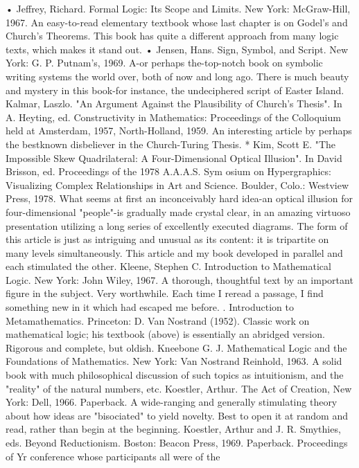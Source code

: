 • Jeffrey, Richard. Formal Logic: Its Scope and Limits. New York: McGraw-Hill, 1967.
  An easy-to-read elementary textbook whose last chapter is on Godel's and Church's
  Theorems. This book has quite a different approach from many logic texts, which
  makes it stand out.
• Jensen, Hans. Sign, Symbol, and Script. New York: G. P. Putnam's, 1969. A-or perhaps
  the-top-notch book on symbolic writing systems the world over, both of now and long
  ago. There is much beauty and mystery in this book-for instance, the undeciphered
  script of Easter Island.
Kalmar, Laszlo. "An Argument Against the Plausibility of Church's Thesis". In A.
  Heyting, ed. Constructivity in Mathematics: Proceedings of the Colloquium held at
  Amsterdam, 1957, North-Holland, 1959. An interesting article by perhaps the
  bestknown disbeliever in the Church-Turing Thesis.
* Kim, Scott E. "The Impossible Skew Quadrilateral: A Four-Dimensional Optical
  Illusion". In David Brisson, ed. Proceedings of the 1978 A.A.A.S. Sym osium on
  Hypergraphics: Visualizing Complex Relationships in Art and Science. Boulder, Colo.:
  Westview Press, 1978. What seems at first an inconceivably hard idea-an optical
  illusion for four-dimensional "people"-is gradually made crystal clear, in an amazing
  virtuoso presentation utilizing a long series of excellently executed diagrams. The form
  of this article is just as intriguing and unusual as its content: it is tripartite on many
  levels simultaneously. This article and my book developed in parallel and each
  stimulated the other.
Kleene, Stephen C. Introduction to Mathematical Logic. New York: John Wiley, 1967. A
  thorough, thoughtful text by an important figure in the subject. Very worthwhile. Each
  time I reread a passage, I find something new in it which had escaped me before.
. Introduction to Metamathematics. Princeton: D. Van Nostrand (1952). Classic work on
  mathematical logic; his textbook (above) is essentially an abridged version. Rigorous
  and complete, but oldish.
Kneebone G. J. Mathematical Logic and the Foundations of Mathematics. New York:
  Van Nostrand Reinhold, 1963. A solid book with much philosophical discussion of
  such topics as intuitionism, and the "reality" of the natural numbers, etc.
Koestler, Arthur. The Act of Creation, New York: Dell, 1966. Paperback. A wide-ranging
  and generally stimulating theory about how ideas are "bisociated" to yield novelty. Best
  to open it at random and read, rather than begin at the beginning.
Koestler, Arthur and J. R. Smythies, eds. Beyond Reductionism. Boston: Beacon Press,
  1969. Paperback. Proceedings of Yr conference whose participants all were of the
